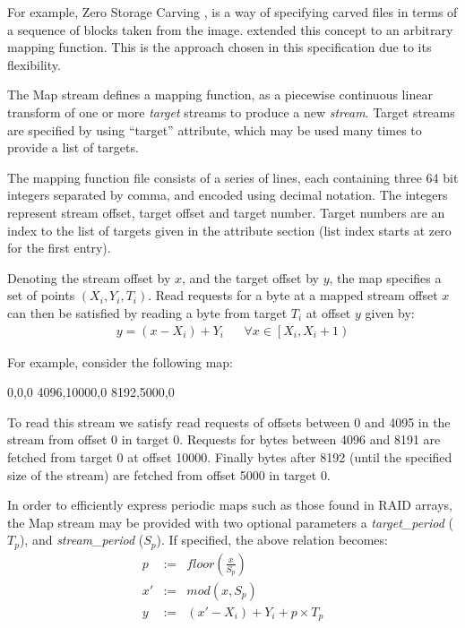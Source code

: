 \documentclass[12pt, conference]{IEEEtran}
\begin{document}
For example, Zero Storage Carving \cite{Meijer2006}, is a way of
specifying carved files in terms of a sequence of blocks taken from
the image. \cite{Cohen2007} extended this concept to an arbitrary
mapping function. This is the approach chosen in this specification
due to its flexibility. 

The Map stream defines a mapping function, as a piecewise continuous
linear transform of one or more {\em target} streams to produce a new
{\em stream}. Target streams are specified by using ``target''
attribute, which may be used many times to provide a list of targets.

The mapping function file consists of a series of lines, each
containing three 64 bit integers separated by comma, and encoded using
decimal notation. The integers represent stream offset, target offset
and target number. Target numbers are an index to the list of targets
given in the attribute section (list index starts at zero for the
first entry).

Denoting the stream offset by $x$, and the target offset by $y$, the
map specifies a set of points $(X_i,Y_i,T_i)$. Read requests for a
byte at a mapped stream offset $x$ can then be satisfied by reading a
byte from target $T_i$ at offset $y$ given by:
\begin{eqnarray}
y = (x - X_i) + Y_i & &
\forall x \in \left [X_i, X_i+1 \right )
\end{eqnarray}

For example, consider the following map:
\begin{verbatim*}
0,0,0
4096,10000,0
8192,5000,0
\end{verbatim*}

To read this stream we satisfy read requests of offsets between 0 and
4095 in the stream from offset 0 in target 0. Requests for bytes
between 4096 and 8191 are fetched from target 0 at offset
10000. Finally bytes after 8192 (until the specified size of the
stream) are fetched from offset 5000 in target 0.

In order to efficiently express periodic maps such as those found in
RAID arrays, the Map stream may be provided with two optional
parameters a {\em target\_period} ($T_p$), and {\em stream\_period}
($S_p$). If specified, the above relation becomes:
\begin{eqnarray*}
p &:=& floor\left (\frac{x}{S_p} \right) \\
x' &:=& mod(x ,S_p)  \\   \label{eq:no1}
y &:=& (x'-X_i) + Y_i + p \times T_p
\end{eqnarray*}
\end{document}
